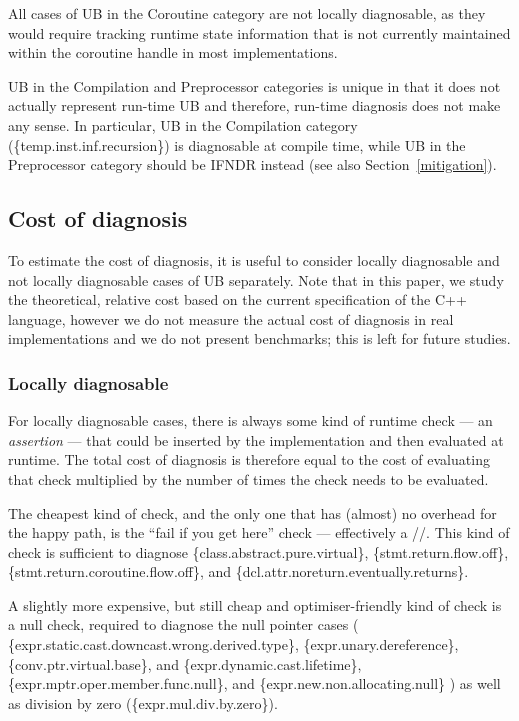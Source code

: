 All cases of UB in the Coroutine category are not locally diagnosable, as they would require tracking runtime state information that is not currently maintained within the coroutine handle in most implementations.

UB in the Compilation and Preprocessor categories is unique in that it does not actually represent run-time UB and therefore, run-time diagnosis does not make any sense. In particular, UB in the Compilation category (\{temp.inst.inf.recursion\}) is diagnosable at compile time, while UB in the Preprocessor category should be IFNDR instead (see also Section~\ref{mitigation}).

\subsection{Cost of diagnosis}
\label{cost}

To estimate the cost of diagnosis, it is useful to consider locally diagnosable and not locally diagnosable cases of UB separately. Note that in this paper, we study the theoretical, relative cost based on the current specification of the C++ language, however we do not measure the actual cost of diagnosis in real implementations and we do not present benchmarks; this is left for future studies.

\subsubsection{Locally diagnosable}

For locally diagnosable cases, there is always some kind of runtime check --- an \emph{assertion} --- that could be inserted by the implementation and then evaluated at runtime. The total cost of diagnosis is therefore equal to the cost of evaluating that check multiplied by the number of times the check needs to be evaluated.

The cheapest kind of check, and the only one that has (almost) no overhead for the happy path, is the ``fail if you get here'' check --- effectively a //. This kind of check is sufficient to diagnose \{class.abstract.pure.virtual\}, \{stmt.return.flow.off\}, \{stmt.return.coroutine.flow.off\}, and \{dcl.attr.noreturn.eventually.returns\}.

A slightly more expensive, but still cheap and optimiser-friendly kind of check is a null check, required to diagnose the null pointer cases  
(
\{expr.static.cast.downcast.wrong.derived.type\},
\{expr.unary.dereference\},
\{conv.ptr.virtual.base\}, and
\{expr.dynamic.cast.lifetime\}, 
\{expr.mptr.oper.member.func.null\}, and
\{expr.new.non.allocating.null\}
) as well as division by zero (\{expr.mul.div.by.zero\}).

